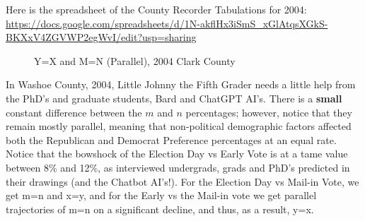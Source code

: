 \documentclass[preprint,13pt]{elsarticle}
\begin{document}
Here is the spreadsheet of the County Recorder Tabulations for 2004: \url{https://docs.google.com/spreadsheets/d/1N-akflHx3iSmS_xGlAtqsXGkS-BKXxV4ZGVWP2egWvI/edit?usp=sharing}
\begin{figure}[bp!]
\begin{center}
\caption{Y=X and M=N (Parallel), 2004 Clark County}
\noindent{}
\end{center}
\end{figure}

\newpage
In Washoe County, 2004, Little Johnny the Fifth Grader needs a little help from the PhD's and graduate students, Bard and ChatGPT AI's. There is a \textbf{small} constant difference between the $m$ and $n$ percentages; however, notice that they remain mostly parallel, meaning that non-political demographic factors affected both the Republican and Democrat Preference percentages at an equal rate. Notice that the bowshock of the Election Day vs Early Vote is at a tame value between 8\% and 12\%, as interviewed undergrads, grads and PhD's predicted in their drawings (and the Chatbot AI's!). For the Election Day vs Mail-in Vote, we get m=n and x=y, and for the Early vs the Mail-in vote we get parallel trajectories of m=n on a significant decline, and thus, as a result, y=x. 
\end{document}
